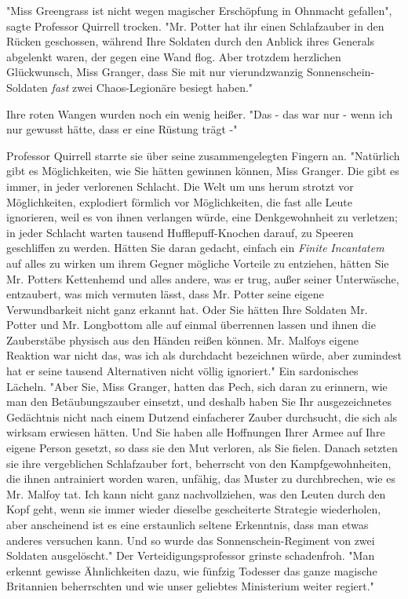 {"Miss Greengrass ist nicht wegen magischer Erschöpfung in Ohnmacht gefallen", sagte Professor Quirrell trocken. "Mr. Potter hat ihr einen Schlafzauber in den Rücken geschossen, während Ihre Soldaten durch den Anblick ihres Generals abgelenkt waren, der gegen eine Wand flog. Aber trotzdem herzlichen Glückwunsch, Miss Granger, dass Sie mit nur vierundzwanzig Sonnenschein-Soldaten \emph{fast} zwei Chaos-Legionäre besiegt haben."

Ihre roten Wangen wurden noch ein wenig heißer. "Das - das war nur - wenn ich nur gewusst hätte, dass er eine Rüstung trägt -"

Professor Quirrell starrte sie über seine zusammengelegten Fingern an. "Natürlich gibt es Möglichkeiten, wie Sie hätten gewinnen können, Miss Granger. Die gibt es immer, in jeder verlorenen Schlacht. Die Welt um uns herum strotzt vor Möglichkeiten, explodiert förmlich vor Möglichkeiten, die fast alle Leute ignorieren, weil es von ihnen verlangen würde, eine Denkgewohnheit zu verletzen; in jeder Schlacht warten tausend Hufflepuff-Knochen darauf, zu Speeren geschliffen zu werden. Hätten Sie daran gedacht, einfach ein \emph{Finite} \emph{Incantatem} auf alles zu wirken um ihrem Gegner mögliche Vorteile zu entziehen, hätten Sie Mr. Potters Kettenhemd und alles andere, was er trug, außer seiner Unterwäsche, entzaubert, was mich vermuten lässt, dass Mr. Potter seine eigene Verwundbarkeit nicht ganz erkannt hat. Oder Sie hätten Ihre Soldaten Mr. Potter und Mr. Longbottom alle auf einmal überrennen lassen und ihnen die Zauberstäbe physisch aus den Händen reißen können. Mr. Malfoys eigene Reaktion war nicht das, was ich als durchdacht bezeichnen würde, aber zumindest hat er seine tausend Alternativen nicht völlig ignoriert." Ein sardonisches Lächeln. "Aber Sie, Miss Granger, hatten das Pech, sich daran zu erinnern, wie man den Betäubungszauber einsetzt, und deshalb haben Sie Ihr ausgezeichnetes Gedächtnis nicht nach einem Dutzend einfacherer Zauber durchsucht, die sich als wirksam erwiesen hätten. Und Sie haben alle Hoffnungen Ihrer Armee auf Ihre eigene Person gesetzt, so dass sie den Mut verloren, als Sie fielen. Danach setzten sie ihre vergeblichen Schlafzauber fort, beherrscht von den Kampfgewohnheiten, die ihnen antrainiert worden waren, unfähig, das Muster zu durchbrechen, wie es Mr. Malfoy tat. Ich kann nicht ganz nachvollziehen, was den Leuten durch den Kopf geht, wenn sie immer wieder dieselbe gescheiterte Strategie wiederholen, aber anscheinend ist es eine erstaunlich seltene Erkenntnis, dass man etwas anderes versuchen kann. Und so wurde das Sonnenschein-Regiment von zwei Soldaten ausgelöscht." Der Verteidigungsprofessor grinste schadenfroh. "Man erkennt gewisse Ähnlichkeiten dazu, wie fünfzig Todesser das ganze magische Britannien beherrschten und wie unser geliebtes Ministerium weiter regiert."

}
